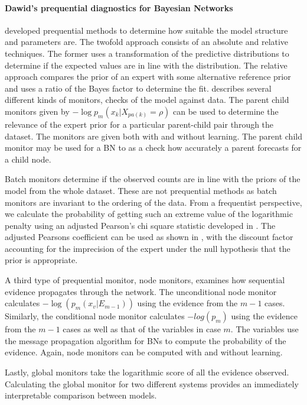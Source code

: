 \documentclass[12pt]{article}
\begin{document}
\paragraph{Dawid's prequential diagnostics for Bayesian Networks}
\cite{DAWID} developed prequential methods to determine how suitable the model structure and parameters are.  
The twofold approach consists of an absolute and relative techniques. The former uses a transformation of the predictive distributions to determine if the expected values are in line with the distribution. The relative approach compares the prior of an expert with some alternative reference prior and uses a ratio of the Bayes factor to determine the fit.
\cite{diagnostics} describes several different kinds of monitors, checks of the model against data. The parent child monitors given by $-\log p_m (x_k | X_{pa(k)}=\rho)$ can be used to determine the relevance of the expert prior for a particular parent-child pair through the dataset. The monitors are given both with and without learning. The parent child monitor may be used for a BN to as a check how accurately a parent forecasts for a child node. 

Batch monitors determine if the observed counts are in line with the priors of the model from the whole dataset. These are not prequential methods as batch monitors are invariant to the ordering of the data.   From a frequentist perspective, we calculate the probability of getting such an extreme value of the logarithmic penalty using an adjusted Pearson's chi square statistic developed in \cite{box} .  The adjusted Pearsons coefficient can be used as shown in \cite{Spiegelhalter1994}, with the discount factor accounting for the imprecision of the expert under the null hypothesis that the prior is appropriate. 

A third type of prequential monitor, node monitors, examines how sequential evidence propagates through the network. The unconditional node monitor calculates $-\log(p_m(x_v | E_{m-1}))$ using the evidence from the $m-1$ cases. Similarly, the conditional node monitor calculates $-log(p_m)$ using the evidence from the $m-1$ cases as well as that of the variables in case $m$. The variables use the message propagation algorithm for BNs to compute the probability of the evidence. Again, node monitors can be computed with and without learning. 

Lastly, global monitors take the logarithmic score of all the evidence observed. Calculating the global monitor for two different systems provides an immediately interpretable comparison between models.
\end{document}
